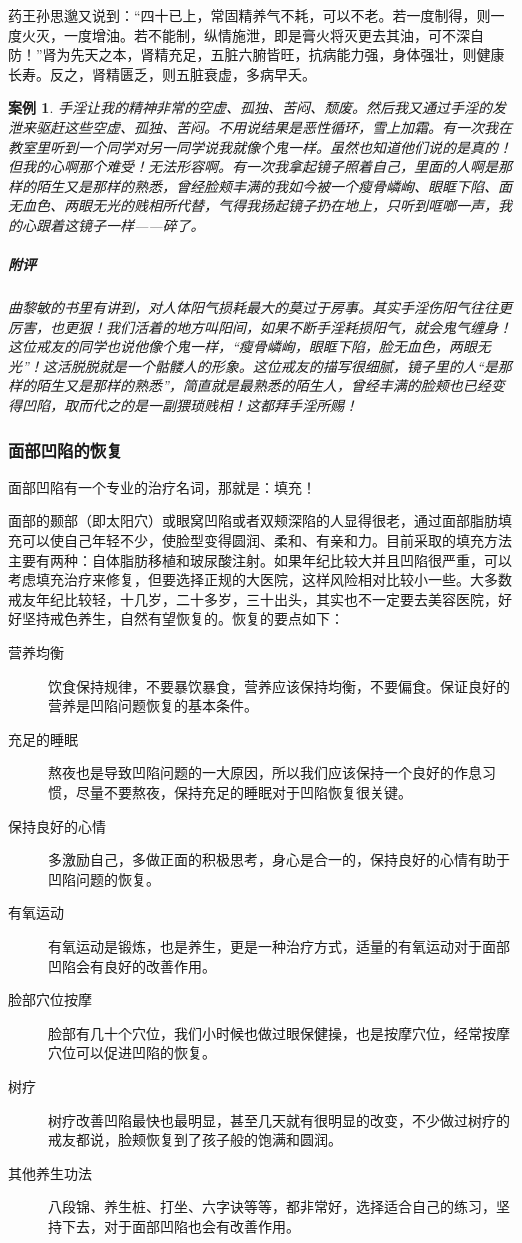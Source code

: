\documentclass{ctexart}
\newtheorem{case}{案例}
\begin{document}
药王孙思邈又说到：“四十已上，常固精养气不耗，可以不老。若一度制得，则一度火灭，一度增油。若不能制，纵情施泄，即是膏火将灭更去其油，可不深自防！”肾为先天之本，肾精充足，五脏六腑皆旺，抗病能力强，身体强壮，则健康长寿。反之，肾精匮乏，则五脏衰虚，多病早夭。

\begin{case}
    手淫让我的精神非常的空虚、孤独、苦闷、颓废。然后我又通过手淫的发泄来驱赶这些空虚、孤独、苦闷。不用说结果是恶性循环，雪上加霜。有一次我在教室里听到一个同学对另一同学说我就像个鬼一样。虽然也知道他们说的是真的！但我的心啊那个难受！无法形容啊。有一次我拿起镜子照着自己，里面的人啊是那样的陌生又是那样的熟悉，曾经脸颊丰满的我如今被一个瘦骨嶙峋、眼眶下陷、面无血色、两眼无光的贱相所代替，气得我扬起镜子扔在地上，只听到哐啷一声，我的心跟着这镜子一样——碎了。
    \subparagraph{附评} 曲黎敏的书里有讲到，对人体阳气损耗最大的莫过于房事。其实手淫伤阳气往往更厉害，也更狠！我们活着的地方叫阳间，如果不断手淫耗损阳气，就会鬼气缠身！这位戒友的同学也说他像个鬼一样，“瘦骨嶙峋，眼眶下陷，脸无血色，两眼无光”！这活脱脱就是一个骷髅人的形象。这位戒友的描写很细腻，镜子里的人“是那样的陌生又是那样的熟悉”，简直就是最熟悉的陌生人，曾经丰满的脸颊也已经变得凹陷，取而代之的是一副猥琐贱相！这都拜手淫所赐！
\end{case}

\subsubsection{面部凹陷的恢复}

面部凹陷有一个专业的治疗名词，那就是：填充！

面部的颞部（即太阳穴）或眼窝凹陷或者双颊深陷的人显得很老，通过面部脂肪填充可以使自己年轻不少，使脸型变得圆润、柔和、有亲和力。目前采取的填充方法主要有两种：自体脂肪移植和玻尿酸注射。如果年纪比较大并且凹陷很严重，可以考虑填充治疗来修复，但要选择正规的大医院，这样风险相对比较小一些。大多数戒友年纪比较轻，十几岁，二十多岁，三十出头，其实也不一定要去美容医院，好好坚持戒色养生，自然有望恢复的。恢复的要点如下：

\begin{description}
    \item[营养均衡] 饮食保持规律，不要暴饮暴食，营养应该保持均衡，不要偏食。保证良好的营养是凹陷问题恢复的基本条件。
    \item[充足的睡眠] 熬夜也是导致凹陷问题的一大原因，所以我们应该保持一个良好的作息习惯，尽量不要熬夜，保持充足的睡眠对于凹陷恢复很关键。
    \item[保持良好的心情] 多激励自己，多做正面的积极思考，身心是合一的，保持良好的心情有助于凹陷问题的恢复。
    \item[有氧运动] 有氧运动是锻炼，也是养生，更是一种治疗方式，适量的有氧运动对于面部凹陷会有良好的改善作用。
    \item[脸部穴位按摩] 脸部有几十个穴位，我们小时候也做过眼保健操，也是按摩穴位，经常按摩穴位可以促进凹陷的恢复。
    \item[树疗] 树疗改善凹陷最快也最明显，甚至几天就有很明显的改变，不少做过树疗的戒友都说，脸颊恢复到了孩子般的饱满和圆润。
    \item[其他养生功法] 八段锦、养生桩、打坐、六字诀等等，都非常好，选择适合自己的练习，坚持下去，对于面部凹陷也会有改善作用。
\end{description}
\end{document}
